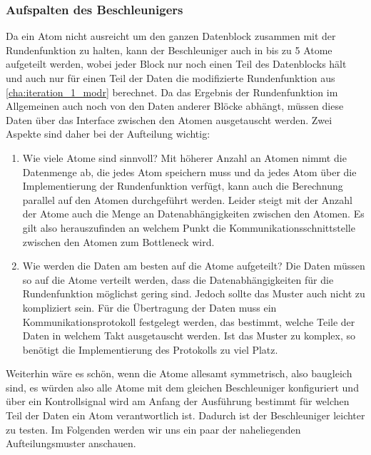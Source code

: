 \subsubsection{Aufspalten des Beschleunigers}
Da ein Atom nicht ausreicht um den ganzen Datenblock zusammen mit der Rundenfunktion zu halten, kann der Beschleuniger auch in bis zu 5 Atome aufgeteilt werden,
wobei jeder Block nur noch einen Teil des Datenblocks hält und auch nur für einen Teil der Daten die modifizierte Rundenfunktion aus \ref{cha:iteration_1_modr} berechnet.
Da das Ergebnis der Rundenfunktion im Allgemeinen auch noch von den Daten anderer Blöcke abhängt, müssen diese Daten über das Interface zwischen den Atomen ausgetauscht werden.
Zwei Aspekte sind daher bei der Aufteilung wichtig:
\begin{enumerate}
    \item Wie viele Atome sind sinnvoll? Mit höherer Anzahl an Atomen nimmt die Datenmenge ab, die jedes Atom speichern muss und da jedes Atom über die Implementierung der Rundenfunktion
    verfügt, kann auch die Berechnung parallel auf den Atomen durchgeführt werden. Leider steigt mit der Anzahl der Atome auch die Menge an Datenabhängigkeiten zwischen den Atomen.
    Es gilt also herauszufinden an welchem Punkt die Kommunikationsschnittstelle zwischen den Atomen zum Bottleneck wird.
    \item Wie werden die Daten am besten auf die Atome aufgeteilt? Die Daten müssen so auf die Atome verteilt werden, dass die Datenabhängigkeiten für die Rundenfunktion möglichst gering sind.
    Jedoch sollte das Muster auch nicht zu kompliziert sein. Für die Übertragung der Daten muss ein Kommunikationsprotokoll festgelegt werden, das bestimmt,
    welche Teile der Daten in welchem Takt ausgetauscht werden. Ist das Muster zu komplex, so benötigt die Implementierung des Protokolls zu viel Platz.
\end{enumerate}
Weiterhin wäre es schön, wenn die Atome allesamt symmetrisch, also baugleich sind, es würden also alle Atome mit dem gleichen Beschleuniger konfiguriert
und über ein Kontrollsignal wird am Anfang der Ausführung bestimmt für welchen Teil der Daten ein Atom verantwortlich ist.
Dadurch ist der Beschleuniger leichter zu testen. Im Folgenden werden wir uns ein paar der naheliegenden Aufteilungsmuster anschauen.

